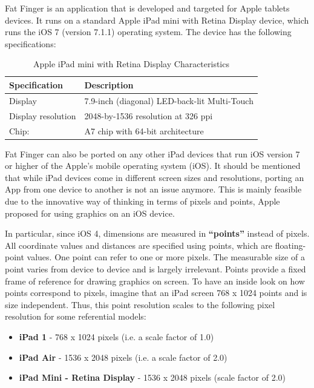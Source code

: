 
Fat Finger is an application that is developed and targeted for Apple tablets devices. It runs on a standard Apple iPad mini with Retina Display device, which runs the iOS 7 (version 7.1.1) operating system. The device has the following specifications:


\begin{table}[H]
\centering
\begin{tabular}{l || l }
Specification & Description \\
\hline
Display & 7.9-inch (diagonal) LED-back-lit Multi-Touch \\
Display resolution & 2048-by-1536 resolution at 326 ppi
\\
Chip: & A7 chip with 64-bit architecture
\end{tabular}
\caption{Apple iPad mini with Retina Display Characteristics}
\label{tab:ipadspecs}
\end{table}


Fat Finger can also be ported on any other iPad devices that run iOS version 7 or higher of the Apple's mobile operating system (iOS). It should be mentioned that while iPad devices come in different screen sizes and resolutions, porting an App from one device to another is not an issue anymore. This is mainly feasible due to the innovative way of thinking in terms of pixels and points, Apple proposed for using graphics on an iOS device. 


In particular, since iOS 4, dimensions are measured in \textbf{“points”} instead of pixels. All coordinate values and distances are specified using points, which are floating-point values. One point can refer to one or more pixels. The measurable size of a point varies from device to device and is largely irrelevant. Points provide a fixed frame of reference for drawing graphics on screen. To have an inside look on how points correspond to pixels, imagine that an iPad screen 768 x 1024 points and is size independent. Thus, this point resolution scales to the following pixel resolution for some referential models:


\begin{itemize}
    \item \textbf{iPad 1} - 768 x 1024 pixels (i.e. a scale factor of 1.0)
    \item \textbf{iPad Air} - 1536 x 2048 pixels (i.e. a scale factor of 2.0)
    \item \textbf{iPad Mini - Retina Display} - 1536 x 2048 pixels (scale factor of 2.0)
 \end{itemize}

